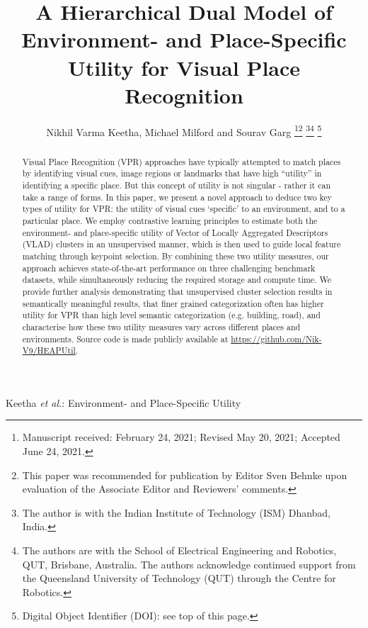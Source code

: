 \documentclass[letterpaper, 10 pt, conference]{ieeeconf}  \fi
\begin{document}
\title{
\ifarxiv\LARGE \bf\fi
A Hierarchical Dual Model of Environment- and Place-Specific Utility for Visual Place Recognition
}


\author{Nikhil Varma Keetha, Michael Milford and Sourav Garg\ifralfinal
\thanks{Manuscript received: February 24, 2021; Revised May 20, 2021; Accepted June 24, 2021.}\thanks{This paper was recommended for publication by Editor Sven Behnke upon evaluation of the Associate Editor and Reviewers' comments.
} \fi
\thanks{The author is with the Indian Institute of Technology (ISM) Dhanbad, India.
}\thanks{The authors are with the School of Electrical Engineering and Robotics, QUT, Brisbane, Australia. The authors acknowledge continued support from the Queensland University of Technology (QUT) through the Centre for Robotics.
}\ifralfinal
\thanks{Digital Object Identifier (DOI): see top of this page.} \fi
}



\ifralfinal
{}
{Keetha \MakeLowercase{\textit{et al.}}: Environment- and Place-Specific Utility}
\fi

\maketitle
\ifarxiv
\thispagestyle{fancy}
\pagestyle{plain}
\fi



\begin{abstract}
Visual Place Recognition (VPR) approaches have typically attempted to match places by identifying visual cues, image regions or landmarks that have high ``utility'' in identifying a specific place. But this concept of utility is not singular - rather it can take a range of forms. In this paper, we present a novel approach to deduce two key types of utility for VPR: the utility of visual cues `specific' to an environment, and to a particular place. We employ contrastive learning principles to estimate both the environment- and place-specific utility of Vector of Locally Aggregated Descriptors (VLAD) clusters in an unsupervised manner, which is then used to guide local feature matching through keypoint selection. By combining these two utility measures, our approach achieves state-of-the-art performance on three challenging benchmark datasets, while simultaneously reducing the required storage and compute time. We provide further analysis demonstrating that unsupervised cluster selection results in semantically meaningful results, that finer grained categorization often has higher utility for VPR than high level semantic categorization (e.g. building, road), and characterise how these two utility measures vary across different places and environments. Source code is made publicly available at \url{https://github.com/Nik-V9/HEAPUtil}.
\end{abstract}
\end{document}
